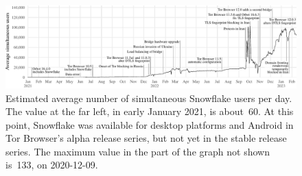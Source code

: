 \documentclass[letterpaper,twocolumn]{article}
\begin{document}

\begin{figure}[t]
\includegraphics{figures/users/users-global}
\caption{
Estimated average number of simultaneous Snowflake users per day.
The value at the far left,
in early January 2021, is about~60.
At this point, Snowflake was available
for desktop platforms and Android
in Tor Browser's alpha release series,
but not yet in the stable release series.
The maximum value in the part of the graph not shown
is~133, on \mbox{2020-12-09}.
}
\label{fig:user-counts}
\end{figure}
\end{document}
